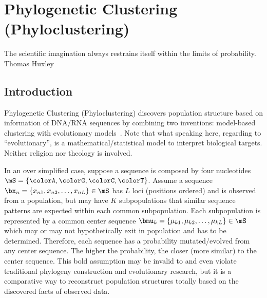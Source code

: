 
\chapter{Phylogenetic Clustering (Phyloclustering)}
\label{chp:phyloclustering}


\inspire
{The scientific imagination always restrains itself within the limits of probability.}%
{Thomas Huxley}


\section{Introduction}

Phylogenetic Clustering (Phyloclustering)
discovers population structure based on information of DNA/RNA sequences
by combining two inventions: model-based clustering with evolutionary
models~\citep{Chen2011a}.
Note that what speaking here, regarding to ``evolutionary'',
is a mathematical/statistical model to interpret biological targets.
Neither religion nor theology is involved. 

In an over simplified case, suppose a sequence is composed by four nucleotides
$\mS = \{\colorA, \colorG, \colorC, \colorT\}$.
Assume a sequence
$\bx_n = \{x_{n1}, x_{n2},\ldots, x_{nL}\} \in \mS$
has $L$ loci (positions ordered) and is observed from a population, but
may have $K$ subpopulations that similar sequence patterns are expected
within each common subpopulation.
Each subpopulation is represented by a common center sequence
$\bmu_k = \{\mu_{k1}, \mu_{k2},\ldots, \mu_{kL}\} \in \mS$
which may or may not hypothetically exit in population and has to be
determined.
Therefore, each sequence has a probability mutated/evolved from any
center sequence. The higher the probability, the closer (more similar)
to the center sequence. This bold assumption may be invalid to and even violate
traditional phylogeny construction and evolutionary research, but it is
a comparative way to reconstruct population structures totally
based on the discovered facts of observed data.

